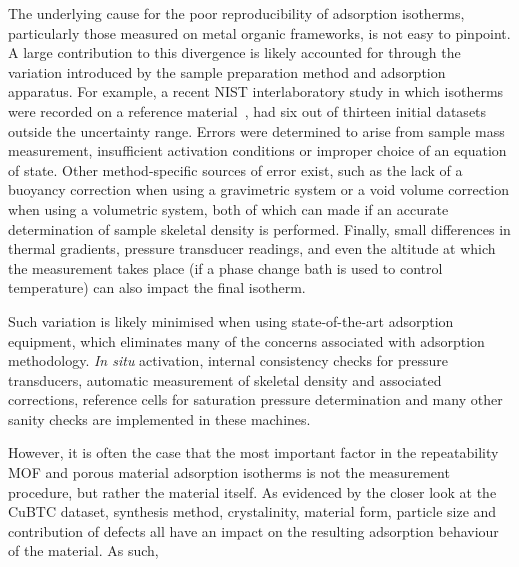 The underlying cause for the poor reproducibility of adsorption
isotherms, particularly those measured on metal organic frameworks,
is not easy to pinpoint. A large contribution to this divergence
is likely accounted for through the variation introduced by the
sample preparation method and adsorption apparatus.
For example, a recent NIST interlaboratory study in which  
isotherms were recorded on a reference 
material~\cite{nguyenReferenceHighpressureCO22018}, had six 
out of thirteen initial datasets outside the uncertainty range.
Errors were determined to arise from sample mass measurement,
insufficient activation conditions or improper choice of an 
equation of state. Other method-specific sources of error exist,
such as the lack of a buoyancy correction when using a 
gravimetric system or a void volume correction when using 
a volumetric system, both of which can made if an accurate
determination of sample skeletal density is performed. Finally,
small differences in thermal gradients, pressure transducer
readings, and even the altitude at which the measurement takes place
(if a phase change bath is used to control temperature)
can also impact the final isotherm.

Such variation is likely minimised when using state-of-the-art 
adsorption equipment, which eliminates many of the concerns
associated with adsorption methodology. \textit{In situ}
activation, internal consistency checks for pressure transducers,
automatic measurement of skeletal density and associated 
corrections, reference cells for saturation pressure determination
and many other sanity checks are implemented in these machines.

However, it is often the case that the most important factor
in the repeatability MOF and porous material adsorption isotherms 
is not the measurement procedure, but rather the material itself.
As evidenced by the closer look at the CuBTC dataset, synthesis
method, crystalinity, material form, particle size and contribution
of defects all have an impact on the resulting adsorption behaviour
of the material. As such, 